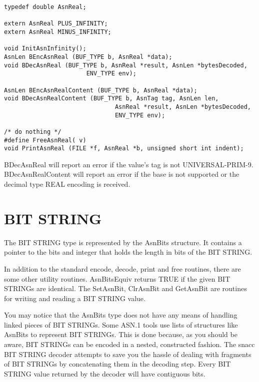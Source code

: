 \begin{small}
\begin{verbatim}
typedef double AsnReal;

extern AsnReal PLUS_INFINITY;
extern AsnReal MINUS_INFINITY;

void InitAsnInfinity();
AsnLen BEncAsnReal (BUF_TYPE b, AsnReal *data);
void BDecAsnReal (BUF_TYPE b, AsnReal *result, AsnLen *bytesDecoded,
                       ENV_TYPE env);

AsnLen BEncAsnRealContent (BUF_TYPE b, AsnReal *data);
void BDecAsnRealContent (BUF_TYPE b, AsnTag tag, AsnLen len,
                               AsnReal *result, AsnLen *bytesDecoded,
                               ENV_TYPE env);

/* do nothing */
#define FreeAsnReal( v)
void PrintAsnReal (FILE *f, AsnReal *b, unsigned short int indent);
\end{verbatim}
\end{small}

{\C BDecAsnReal} will report an error if the value's tag is not UNIVERSAL-PRIM-9.
{\C BDecAsnRealContent} will report an error if the base is not supported or the decimal type REAL encoding is received.


\section{\label{bits-C-section}BIT STRING}

The BIT STRING type is represented by the {\C AsnBits} structure.  It
contains a pointer to the bits and integer that holds the length
in bits of the BIT STRING\@.

In addition to the standard encode, decode, print and free routines,
there are some other utility routines.  {\C AsnBitsEquiv} returns
TRUE if the given BIT STRINGs are identical.  The {\C SetAsnBit},
{\C ClrAsnBit} and {\C GetAsnBit} are routines for writing and
reading a BIT STRING value.

You may notice that the AsnBits type does not have any means of
handling linked pieces of BIT STRINGs. Some ASN.1 tools use lists of
structures like {\C AsnBits} to represent BIT STRINGs.  This is done
because, as you should be aware, BIT STRINGs can be encoded in a
nested, constructed fashion.  The snacc BIT STRING decoder attempts to
save you the hassle of dealing with fragments of BIT STRINGs by
concatenating them in the decoding step.  Every BIT STRING value
returned by the decoder will have contiguous bits.

